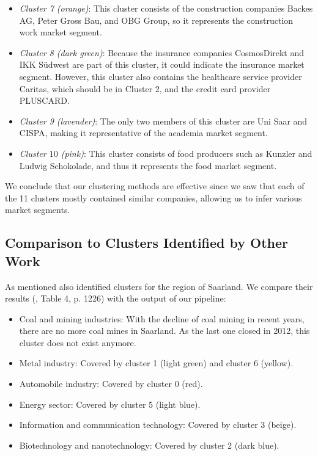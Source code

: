 \documentclass[conference]{IEEEtran}
\begin{document}
\begin{itemize}
	\item \textit{Cluster 7 (orange)}: This cluster consists of the construction companies Backes AG, Peter Gross Bau, and OBG Group, so it represents the construction work market segment.
	
	\item \textit{Cluster 8 (dark green)}: Because the insurance companies CosmosDirekt and IKK Südwest are part of this cluster, it could indicate the insurance market segment. However, this cluster also contains the healthcare service provider Caritas, which should be in Cluster 2, and the credit card provider PLUSCARD.
	
	\item \textit{Cluster 9 (lavender)}: The only two members of this cluster are Uni Saar and CISPA, making it representative of the academia market segment.
	
	\item \textit{Cluster $10$ (pink)}: This cluster consists of food producers such as Kunzler and Ludwig Schokolade, and thus it represents the food market segment.
\end{itemize}
We conclude that our clustering methods are effective since we saw that each of the 11 clusters mostly contained similar companies, allowing us to infer various market segments.

\subsection{Comparison to Clusters Identified by Other Work}

As mentioned \cite{saarlandeco2} also identified clusters for the region of Saarland. We compare their results (\cite{saarlandeco2}, Table 4, p. 1226) with the output of our pipeline:


\begin{itemize}
	\item Coal and mining industries: With the decline of coal mining in recent years, there are no more coal mines in Saarland. As the last one closed in 2012, this cluster does not exist anymore. 
	\item Metal industry: Covered by cluster 1 (light green) and cluster 6 (yellow).
	\item Automobile industry: Covered by cluster 0 (red).
	\item Energy sector: Covered by cluster 5 (light blue).
	\item Information and communication technology: Covered by cluster 3 (beige).
	\item Biotechnology and nanotechnology: Covered by cluster 2 (dark blue).
\end{itemize}
\end{document}
